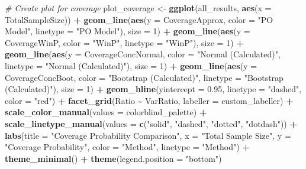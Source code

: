 \documentclass[
  letterpaper,
  DIV=11,
  numbers=noendperiod]{scrartcl}
\newenvironment{Shaded}{\begin{snugshade}}{\end{snugshade}}
\newcommand{\AttributeTok}[1]{\textcolor[rgb]{0.13,0.29,0.53}{#1}}
\newcommand{\CommentTok}[1]{\textcolor[rgb]{0.56,0.35,0.01}{\textit{#1}}}
\newcommand{\DecValTok}[1]{\textcolor[rgb]{0.00,0.00,0.81}{#1}}
\newcommand{\FloatTok}[1]{\textcolor[rgb]{0.00,0.00,0.81}{#1}}
\newcommand{\FunctionTok}[1]{\textcolor[rgb]{0.13,0.29,0.53}{\textbf{#1}}}
\newcommand{\NormalTok}[1]{#1}
\newcommand{\OtherTok}[1]{\textcolor[rgb]{0.56,0.35,0.01}{#1}}
\newcommand{\SpecialCharTok}[1]{\textcolor[rgb]{0.81,0.36,0.00}{\textbf{#1}}}
\newcommand{\StringTok}[1]{\textcolor[rgb]{0.31,0.60,0.02}{#1}}
\begin{document}
\begin{Shaded}
\begin{Highlighting}[]
\CommentTok{\# Create plot for coverage}
\NormalTok{plot\_coverage }\OtherTok{\textless{}{-}} \FunctionTok{ggplot}\NormalTok{(all\_results, }\FunctionTok{aes}\NormalTok{(}\AttributeTok{x =}\NormalTok{ TotalSampleSize)) }\SpecialCharTok{+}
  \FunctionTok{geom\_line}\NormalTok{(}\FunctionTok{aes}\NormalTok{(}\AttributeTok{y =}\NormalTok{ CoverageApprox, }\AttributeTok{color =} \StringTok{"PO Model"}\NormalTok{, }\AttributeTok{linetype =} \StringTok{"PO Model"}\NormalTok{), }\AttributeTok{size =} \DecValTok{1}\NormalTok{) }\SpecialCharTok{+}
  \FunctionTok{geom\_line}\NormalTok{(}\FunctionTok{aes}\NormalTok{(}\AttributeTok{y =}\NormalTok{ CoverageWinP, }\AttributeTok{color =} \StringTok{"WinP"}\NormalTok{, }\AttributeTok{linetype =} \StringTok{"WinP"}\NormalTok{), }\AttributeTok{size =} \DecValTok{1}\NormalTok{) }\SpecialCharTok{+}
  \FunctionTok{geom\_line}\NormalTok{(}\FunctionTok{aes}\NormalTok{(}\AttributeTok{y =}\NormalTok{ CoverageConcNormal, }\AttributeTok{color =} \StringTok{"Normal (Calculated)"}\NormalTok{, }\AttributeTok{linetype =} \StringTok{"Normal (Calculated)"}\NormalTok{), }\AttributeTok{size =} \DecValTok{1}\NormalTok{) }\SpecialCharTok{+}
  \FunctionTok{geom\_line}\NormalTok{(}\FunctionTok{aes}\NormalTok{(}\AttributeTok{y =}\NormalTok{ CoverageConcBoot, }\AttributeTok{color =} \StringTok{"Bootstrap (Calculated)"}\NormalTok{, }\AttributeTok{linetype =} \StringTok{"Bootstrap (Calculated)"}\NormalTok{), }\AttributeTok{size =} \DecValTok{1}\NormalTok{) }\SpecialCharTok{+}
  \FunctionTok{geom\_hline}\NormalTok{(}\AttributeTok{yintercept =} \FloatTok{0.95}\NormalTok{, }\AttributeTok{linetype =} \StringTok{"dashed"}\NormalTok{, }\AttributeTok{color =} \StringTok{"red"}\NormalTok{) }\SpecialCharTok{+}
  \FunctionTok{facet\_grid}\NormalTok{(Ratio }\SpecialCharTok{\textasciitilde{}}\NormalTok{ VarRatio, }\AttributeTok{labeller =}\NormalTok{ custom\_labeller) }\SpecialCharTok{+}
  \FunctionTok{scale\_color\_manual}\NormalTok{(}\AttributeTok{values =}\NormalTok{ colorblind\_palette) }\SpecialCharTok{+}
  \FunctionTok{scale\_linetype\_manual}\NormalTok{(}\AttributeTok{values =} \FunctionTok{c}\NormalTok{(}\StringTok{"solid"}\NormalTok{, }\StringTok{"dashed"}\NormalTok{, }\StringTok{"dotted"}\NormalTok{, }\StringTok{"dotdash"}\NormalTok{)) }\SpecialCharTok{+}
  \FunctionTok{labs}\NormalTok{(}\AttributeTok{title =} \StringTok{"Coverage Probability Comparison"}\NormalTok{,}
       \AttributeTok{x =} \StringTok{"Total Sample Size"}\NormalTok{,}
       \AttributeTok{y =} \StringTok{"Coverage Probability"}\NormalTok{,}
       \AttributeTok{color =} \StringTok{"Method"}\NormalTok{,}
       \AttributeTok{linetype =} \StringTok{"Method"}\NormalTok{) }\SpecialCharTok{+}
  \FunctionTok{theme\_minimal}\NormalTok{() }\SpecialCharTok{+}
  \FunctionTok{theme}\NormalTok{(}\AttributeTok{legend.position =} \StringTok{"bottom"}\NormalTok{)}


\end{Highlighting}
\end{Shaded}
\end{document}
